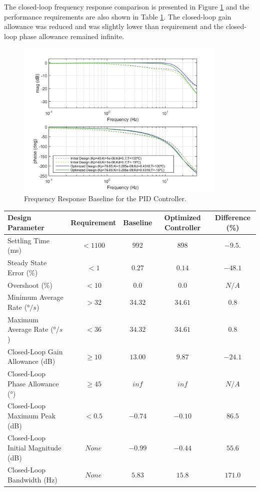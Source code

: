 The closed-loop frequency response comparison is presented in Figure \ref{fig:5_1_4_PID_FreqResp} and the performance requirements are also shown in Table \ref{table:5_1_4_PID_PerfTable}. The closed-loop gain allowance was reduced and was slightly lower than requirement and the closed-loop phase allowance remained infinite. 

\begin{figure}[H]
	\centering
	\centerline{\includegraphics[width=0.9\textwidth]{Figuras/5.OptimizationResults/5-1-4-PID-FrequencyResponseComparison.jpg}}
	\caption{Frequency Response Baseline for the PID Controller.}
	\label{fig:5_1_4_PID_FreqResp}
\end{figure}

\begin{table}[H]
	\label{table:5_1_4_PID_PerfTable}
	\centering
	\resizebox{14cm}{!} {
		\begin{tabular}{|l|c|c|c|c|}
			\hline
			Design Parameter & Requirement & Baseline & Optimized Controller & Difference (\%) \\ \hline
			Settling Time (ms) & $< 1100 $ & $992$ & $898$ & $-9.5.$ \\ \hline
			Steady State Error ($\%$) & $< 1$ & $0.27$ & $0.14$ & $-48.1$ \\ \hline
			Overshoot ($\%$) & $< 10 $  & $0.0$ & $0.0$ & $N/A$ \\ \hline
			Minimum Average Rate ($°/s$) & $> 32$ & $34.32$ & $34.61$ & $0.8$ \\ \hline
			Maximum Average Rate ($°/s$) & $< 36$ & $34.32$ & $34.61$ & $0.8$ \\ \hline
			Closed-Loop Gain Allowance (dB) & $ \geq 10 $ & $13.00$ & $9.87$ & $-24.1$ \\ \hline
			Closed-Loop Phase Allowance ($°$) & $ \geq 45$ & $inf$ & $inf$ & $N/A$ \\ \hline
			Closed-Loop Maximum Peak (dB) & $ < 0.5$ & $-0.74$ & $-0.10$ & $86.5$ \\ \hline
			Closed-Loop Initial Magnitude (dB) & $None$ & $-0.99$ & $-0.44$ & $55.6$ \\ \hline
			Closed-Loop Bandwidth (Hz) & $None$ & $5.83$ & $15.8$ & $171.0$ \\ \hline
	\end{tabular}}
\end{table}

